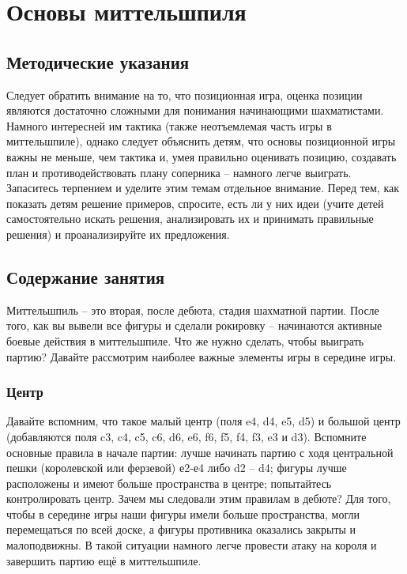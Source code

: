 \chapter{Основы миттельшпиля}

\section{Методические указания}

Следует обратить внимание на то, что позиционная игра, оценка позиции являются достаточно сложными для понимания начинающими шахматистами. Намного интересней им тактика (также неотъемлемая часть игры в миттельшпиле), однако следует объяснить детям, что основы позиционной игры важны не меньше, чем тактика и, умея правильно оценивать позицию, создавать план и противодействовать плану соперника – намного легче выиграть. Запаситесь терпением и уделите этим темам отдельное внимание. Перед тем, как показать детям решение примеров, спросите, есть ли у них идеи (учите детей самостоятельно искать решения, анализировать их и принимать правильные решения) и проанализируйте их предложения.

\section{Содержание занятия}

Миттельшпиль – это вторая, после дебюта, стадия шахматной партии. После того, как вы вывели все фигуры и сделали рокировку – начинаются активные боевые действия в миттельшпиле. Что же нужно сделать, чтобы выиграть партию? Давайте рассмотрим наиболее важные элементы игры в середине игры. 

\subsection{Центр}

Давайте вспомним, что такое малый центр (поля e4, d4, e5, d5) и большой центр (добавляются поля c3, c4, c5, c6, d6, e6, f6, f5, f4, f3, e3 и d3). Вспомните основные правила в начале партии: лучше начинать партию с ходя центральной пешки (королевской или ферзевой) е2-е4 либо d2 – d4; фигуры лучше расположены и имеют больше пространства в центре; попытайтесь контролировать центр. Зачем мы следовали этим правилам в дебюте? Для того, чтобы в середине игры наши фигуры имели больше пространства, могли перемещаться по всей доске, а фигуры противника оказались закрыты и малоподвижны. В такой ситуации намного легче провести атаку на короля и завершить партию ещё в миттельшпиле. 

